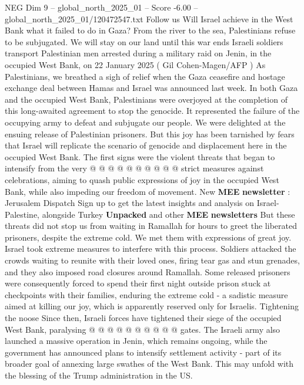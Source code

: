 \begin{textsample}{NEG Dim 9 – global\_north\_2025\_01 – Score -6.00 – global\_north\_2025\_01/120472547.txt}  \label{ex:f9_neg_102}
Follow us Will Israel achieve in the West Bank what it failed to do in Gaza?
From the river to the sea, Palestinians refuse to be subjugated.
We will stay on our land until this war ends Israeli soldiers transport Palestinian men arrested during a military raid on Jenin, in the occupied West Bank, on 22 January 2025 ( Gil Cohen-Magen/AFP ) As Palestinians, we breathed a sigh of relief when the Gaza ceasefire and hostage exchange deal between Hamas and Israel was announced last week.
In both Gaza and the occupied West Bank, Palestinians were overjoyed at the completion of this long-awaited agreement to stop the genocide.
It represented the failure of the occupying army to defeat and subjugate our people.
We were delighted at the ensuing release of Palestinian prisoners.
But this joy has been tarnished by fears that Israel will replicate the scenario of genocide and displacement here in the occupied West Bank.
The first signs were the violent threats that began to intensify from the very @ @ @ @ @ @ @ @ @ @ strict measures against celebrations, aiming to quash public expressions of joy in the occupied West Bank, while also impeding our freedom of movement.
New \textbf{MEE} \textbf{newsletter} : Jerusalem Dispatch Sign up to get the latest insights and analysis on Israel-Palestine, alongside Turkey \textbf{Unpacked} and other \textbf{MEE} \textbf{newsletters} But these threats did not stop us from waiting in Ramallah for hours to greet the liberated prisoners, despite the extreme cold.
We met them with expressions of great joy.
Israel took extreme measures to interfere with this process.
Soldiers attacked the crowds waiting to reunite with their loved ones, firing tear gas and stun grenades, and they also imposed road closures around Ramallah.
Some released prisoners were consequently forced to spend their first night outside prison stuck at checkpoints with their families, enduring the extreme cold - a sadistic measure aimed at killing our joy, which is apparently reserved only for Israelis.
Tightening the noose Since then, Israeli forces have tightened their siege of the occupied West Bank, paralysing @ @ @ @ @ @ @ @ @ @ gates.
The Israeli army also launched a massive operation in Jenin, which remains ongoing, while the government has announced plans to intensify settlement activity - part of its broader goal of annexing large swathes of the West Bank.
This may unfold with the blessing of the Trump administration in the US.

\end{textsample}
